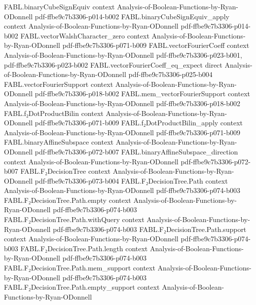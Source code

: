 \begin{theorem}
\proofstep
  {FABL.binaryCubeSignEquiv}
  {context}
  {Analysis-of-Boolean-Functions-by-Ryan-ODonnell}
  {pdf-ffbe9c7b3306-p014-b002}
\proofstep
  {FABL.binaryCubeSignEquiv_apply}
  {context}
  {Analysis-of-Boolean-Functions-by-Ryan-ODonnell}
  {pdf-ffbe9c7b3306-p014-b002}
\proofstep
  {FABL.vectorWalshCharacter_zero}
  {context}
  {Analysis-of-Boolean-Functions-by-Ryan-ODonnell}
  {pdf-ffbe9c7b3306-p071-b009}
\proofstep
  {FABL.vectorFourierCoeff}
  {context}
  {Analysis-of-Boolean-Functions-by-Ryan-ODonnell}
  {pdf-ffbe9c7b3306-p023-b001,
    pdf-ffbe9c7b3306-p023-b002}
\proofstep
  {FABL.vectorFourierCoeff_eq_expect}
  {direct}
  {Analysis-of-Boolean-Functions-by-Ryan-ODonnell}
  {pdf-ffbe9c7b3306-p025-b004}
\proofstep
  {FABL.vectorFourierSupport}
  {context}
  {Analysis-of-Boolean-Functions-by-Ryan-ODonnell}
  {pdf-ffbe9c7b3306-p018-b002}
\proofstep
  {FABL.mem_vectorFourierSupport}
  {context}
  {Analysis-of-Boolean-Functions-by-Ryan-ODonnell}
  {pdf-ffbe9c7b3306-p018-b002}
\proofstep
  {FABL.f₂DotProductBilin}
  {context}
  {Analysis-of-Boolean-Functions-by-Ryan-ODonnell}
  {pdf-ffbe9c7b3306-p071-b009}
\proofstep
  {FABL.f₂DotProductBilin_apply}
  {context}
  {Analysis-of-Boolean-Functions-by-Ryan-ODonnell}
  {pdf-ffbe9c7b3306-p071-b009}
\proofstep
  {FABL.binaryAffineSubspace}
  {context}
  {Analysis-of-Boolean-Functions-by-Ryan-ODonnell}
  {pdf-ffbe9c7b3306-p072-b007}
\proofstep
  {FABL.binaryAffineSubspace_direction}
  {context}
  {Analysis-of-Boolean-Functions-by-Ryan-ODonnell}
  {pdf-ffbe9c7b3306-p072-b007}
\proofstep
  {FABL.F₂DecisionTree}
  {context}
  {Analysis-of-Boolean-Functions-by-Ryan-ODonnell}
  {pdf-ffbe9c7b3306-p073-b004}
\proofstep
  {FABL.F₂DecisionTree.Path}
  {context}
  {Analysis-of-Boolean-Functions-by-Ryan-ODonnell}
  {pdf-ffbe9c7b3306-p074-b003}
\proofstep
  {FABL.F₂DecisionTree.Path.empty}
  {context}
  {Analysis-of-Boolean-Functions-by-Ryan-ODonnell}
  {pdf-ffbe9c7b3306-p074-b003}
\proofstep
  {FABL.F₂DecisionTree.Path.withQuery}
  {context}
  {Analysis-of-Boolean-Functions-by-Ryan-ODonnell}
  {pdf-ffbe9c7b3306-p074-b003}
\proofstep
  {FABL.F₂DecisionTree.Path.support}
  {context}
  {Analysis-of-Boolean-Functions-by-Ryan-ODonnell}
  {pdf-ffbe9c7b3306-p074-b003}
\proofstep
  {FABL.F₂DecisionTree.Path.length}
  {context}
  {Analysis-of-Boolean-Functions-by-Ryan-ODonnell}
  {pdf-ffbe9c7b3306-p074-b003}
\proofstep
  {FABL.F₂DecisionTree.Path.mem_support}
  {context}
  {Analysis-of-Boolean-Functions-by-Ryan-ODonnell}
  {pdf-ffbe9c7b3306-p074-b003}
\proofstep
  {FABL.F₂DecisionTree.Path.empty_support}
  {context}
  {Analysis-of-Boolean-Functions-by-Ryan-ODonnell}

\end{theorem}
